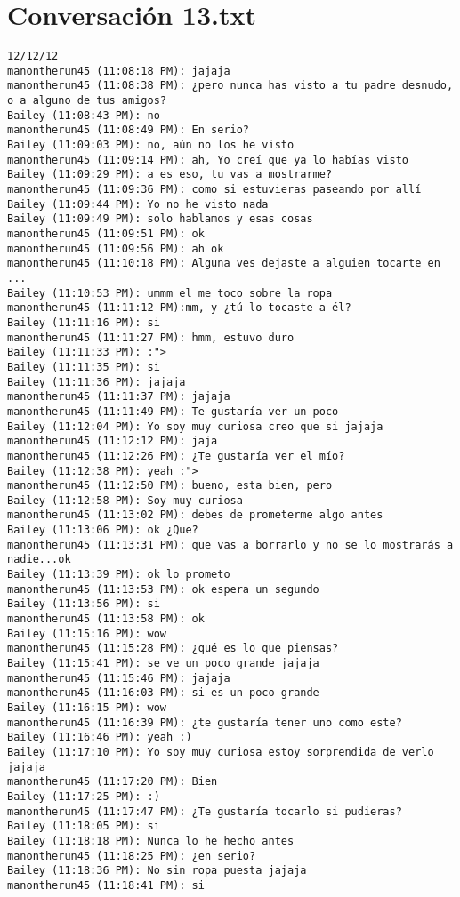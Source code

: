 \section{Conversaci\'on 13.txt}

\begin{verbatim}
12/12/12
manontherun45 (11:08:18 PM): jajaja
manontherun45 (11:08:38 PM): ¿pero nunca has visto a tu padre desnudo, o a alguno de tus amigos?
Bailey (11:08:43 PM): no
manontherun45 (11:08:49 PM): En serio?
Bailey (11:09:03 PM): no, aún no los he visto
manontherun45 (11:09:14 PM): ah, Yo creí que ya lo habías visto
Bailey (11:09:29 PM): a es eso, tu vas a mostrarme?
manontherun45 (11:09:36 PM): como si estuvieras paseando por allí
Bailey (11:09:44 PM): Yo no he visto nada
Bailey (11:09:49 PM): solo hablamos y esas cosas
manontherun45 (11:09:51 PM): ok
manontherun45 (11:09:56 PM): ah ok
manontherun45 (11:10:18 PM): Alguna ves dejaste a alguien tocarte en ...
Bailey (11:10:53 PM): ummm el me toco sobre la ropa
manontherun45 (11:11:12 PM):mm, y ¿tú lo tocaste a él?
Bailey (11:11:16 PM): si
manontherun45 (11:11:27 PM): hmm, estuvo duro
Bailey (11:11:33 PM): :">
Bailey (11:11:35 PM): si
Bailey (11:11:36 PM): jajaja
manontherun45 (11:11:37 PM): jajaja
manontherun45 (11:11:49 PM): Te gustaría ver un poco
Bailey (11:12:04 PM): Yo soy muy curiosa creo que si jajaja
manontherun45 (11:12:12 PM): jaja
manontherun45 (11:12:26 PM): ¿Te gustaría ver el mío?
Bailey (11:12:38 PM): yeah :">
manontherun45 (11:12:50 PM): bueno, esta bien, pero
Bailey (11:12:58 PM): Soy muy curiosa
manontherun45 (11:13:02 PM): debes de prometerme algo antes
Bailey (11:13:06 PM): ok ¿Que?
manontherun45 (11:13:31 PM): que vas a borrarlo y no se lo mostrarás a nadie...ok
Bailey (11:13:39 PM): ok lo prometo
manontherun45 (11:13:53 PM): ok espera un segundo
Bailey (11:13:56 PM): si
manontherun45 (11:13:58 PM): ok
Bailey (11:15:16 PM): wow
manontherun45 (11:15:28 PM): ¿qué es lo que piensas?
Bailey (11:15:41 PM): se ve un poco grande jajaja
manontherun45 (11:15:46 PM): jajaja
manontherun45 (11:16:03 PM): si es un poco grande
Bailey (11:16:15 PM): wow
manontherun45 (11:16:39 PM): ¿te gustaría tener uno como este?
Bailey (11:16:46 PM): yeah :)
Bailey (11:17:10 PM): Yo soy muy curiosa estoy sorprendida de verlo jajaja
manontherun45 (11:17:20 PM): Bien
Bailey (11:17:25 PM): :)
manontherun45 (11:17:47 PM): ¿Te gustaría tocarlo si pudieras?
Bailey (11:18:05 PM): si 
Bailey (11:18:18 PM): Nunca lo he hecho antes
manontherun45 (11:18:25 PM): ¿en serio?
Bailey (11:18:36 PM): No sin ropa puesta jajaja
manontherun45 (11:18:41 PM): si

\end{verbatim}
